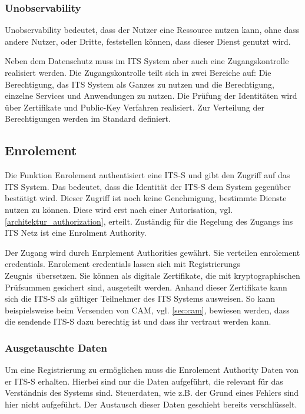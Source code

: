 \subsubsection{Unobservability}
Unobservability bedeutet, dass der Nutzer eine Ressource nutzen kann, ohne dass andere Nutzer, oder Dritte, feststellen können, dass dieser Dienst genutzt wird.



Neben dem Datenschutz muss im \ac{ITS} System aber auch eine Zugangskontrolle realisiert werden. Die Zugangskontrolle teilt sich in zwei Bereiche auf: Die Berechtigung, das \ac{ITS} System als Ganzes zu nutzen und die Berechtigung, einzelne Services und Anwendungen zu nutzen. Die Prüfung der Identitäten wird über Zertifikate und Public-Key Verfahren realisiert. Zur Verteilung der Berechtigungen werden im Standard \cite{ts102731} definiert.









\subsection{Enrolement \label{architektur_enrolement}}
Die Funktion Enrolement authentisiert eine \ac{ITS-S} und gibt den Zugriff auf das  \ac{ITS} System.  Das bedeutet, dass die Identität der \ac{ITS-S} dem System gegenüber bestätigt wird. Dieser Zugriff ist noch keine Genehmigung, bestimmte Dienste nutzen zu können. Diese wird erst nach einer Autorisation, vgl. \autoref{architektur_authorization}, erteilt. Zuständig für die Regelung des Zugangs ins \ac{ITS} Netz ist eine Enrolment Authority.

Der Zugang wird durch Enrplement Authorities gewährt. Sie verteilen  enrolement credentials. Enrolement credentials lassen sich mit \glqq Registrierungs Zeugnis\grqq~übersetzen. Sie können als digitale Zertifikate, die  mit kryptographischen Prüfsummen gesichert sind, ausgeteilt werden. Anhand dieser Zertifikate kann sich die \ac{ITS-S} als gültiger Teilnehmer des \ac{ITS} Systems ausweisen. So kann beispielsweise beim Versenden von \ac{CAM}, vgl. \autoref{sec:cam}, bewiesen werden, dass die sendende \ac{ITS-S} dazu berechtig ist und dass ihr vertraut werden kann. 

\subsubsection{Ausgetauschte Daten}
Um eine Registrierung zu ermöglichen muss die Enrolement Authority Daten von er \ac{ITS-S} erhalten. Hierbei sind nur die Daten aufgeführt, die relevant für das Verständnis des Systems sind. Steuerdaten, wie z.B. der Grund eines Fehlers sind hier nicht aufgeführt. Der Austausch dieser Daten geschieht bereits verschlüsselt. 

